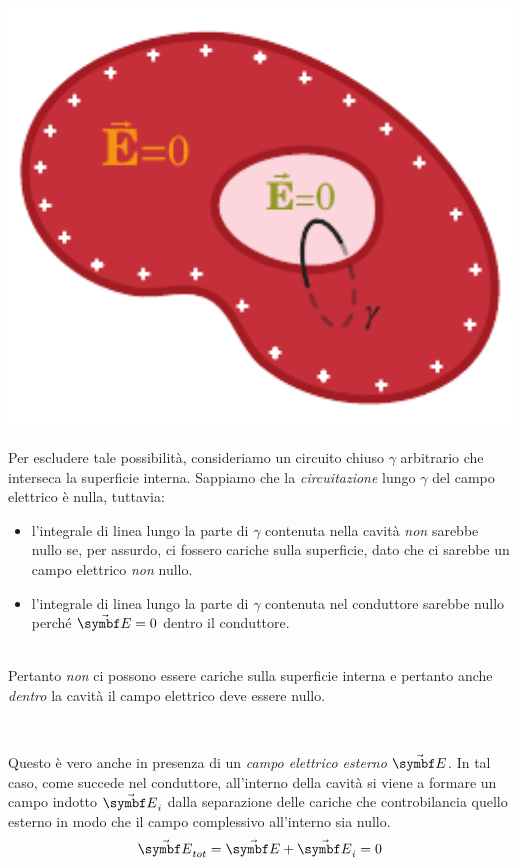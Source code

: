 \begin{demonstration}
\begin{minipage}{0.35\textwidth}
	\begin{center}
		\includegraphics[width=1\textwidth]{images/chp4/chp4condcavodim2.pdf}
	\end{center}
\end{minipage}\hspace{5pt}
\begin{minipage}{0.64\textwidth}
	Per escludere tale possibilità, consideriamo un circuito chiuso $\gamma$ arbitrario che interseca la superficie interna.
	Sappiamo che la \textit{circuitazione} lungo $\gamma$ del campo elettrico è nulla, tuttavia:
	\begin{itemize}
		\item l'integrale di linea lungo la parte di $\gamma$ contenuta nella cavità \textit{non} sarebbe nullo se, per assurdo, ci fossero cariche sulla superficie, dato che ci sarebbe un campo elettrico \textit{non} nullo.
		\item l'integrale di linea lungo la parte di $\gamma$ contenuta nel conduttore sarebbe nullo perché $\vba{E}=0$ dentro il conduttore.
	\end{itemize}
\end{minipage}\\
Pertanto \textit{non} ci possono essere cariche sulla superficie interna e pertanto anche \textit{dentro} la cavità il campo elettrico deve essere nullo.
\end{demonstration}~\\
\begin{minipage}{0.56\textwidth}%
Questo è vero anche in presenza di un \textit{campo elettrico esterno} $\vba{E}$. In tal caso, come succede nel conduttore, all'interno della cavità si viene a formare un campo indotto $\vba{E}_i$ dalla separazione delle cariche  che controbilancia quello esterno in modo che il campo complessivo all'interno sia nullo.
\begin{equation*}
	\vba{E}_{tot}=\vba{E}+\vba{E}_i=0
\end{equation*}
\end{minipage}
